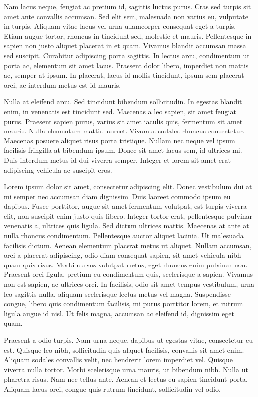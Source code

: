 Nam lacus neque, feugiat ac pretium id, sagittis luctus purus. Cras sed turpis sit amet ante convallis accumsan. Sed elit sem, malesuada non varius eu, vulputate in turpis. Aliquam vitae lacus vel urna ullamcorper consequat eget a turpis. Etiam augue tortor, rhoncus in tincidunt sed, molestie et mauris. Pellentesque in sapien non justo aliquet placerat in et quam. Vivamus blandit accumsan massa sed suscipit. Curabitur adipiscing porta sagittis. In lectus arcu, condimentum ut porta ac, elementum sit amet lacus. Praesent dolor libero, imperdiet non mattis ac, semper at ipsum. In placerat, lacus id mollis tincidunt, ipsum sem placerat orci, ac interdum metus est id mauris.

Nulla at eleifend arcu. Sed tincidunt bibendum sollicitudin. In egestas blandit enim, in venenatis est tincidunt sed. Maecenas a leo sapien, sit amet feugiat purus. Praesent sapien purus, varius sit amet iaculis quis, fermentum sit amet mauris. Nulla elementum mattis laoreet. Vivamus sodales rhoncus consectetur. Maecenas posuere aliquet risus porta tristique. Nullam nec neque vel ipsum facilisis fringilla at bibendum ipsum. Donec sit amet lacus sem, id ultrices mi. Duis interdum metus id dui viverra semper. Integer et lorem sit amet erat adipiscing vehicula ac suscipit eros. 

Lorem ipsum dolor sit amet, consectetur adipiscing elit. Donec vestibulum dui at mi semper nec accumsan diam dignissim. Duis laoreet commodo ipsum eu dapibus. Fusce porttitor, augue sit amet fermentum volutpat, est turpis viverra elit, non suscipit enim justo quis libero. Integer tortor erat, pellentesque pulvinar venenatis a, ultrices quis ligula. Sed dictum ultrices mattis. Maecenas at ante at nulla rhoncus condimentum. Pellentesque auctor aliquet lacinia. Ut malesuada facilisis dictum. Aenean elementum placerat metus ut aliquet. Nullam accumsan, orci a placerat adipiscing, odio diam consequat sapien, sit amet vehicula nibh quam quis risus. Morbi cursus volutpat metus, eget rhoncus enim pulvinar non. Praesent orci ligula, pretium eu condimentum quis, scelerisque a sapien. Vivamus non est sapien, ac ultrices orci. In facilisis, odio sit amet tempus vestibulum, urna leo sagittis nulla, aliquam scelerisque lectus metus vel magna. Suspendisse congue, libero quis condimentum facilisis, mi purus porttitor lorem, et rutrum ligula augue id nisl. Ut felis magna, accumsan ac eleifend id, dignissim eget quam.

Praesent a odio turpis. Nam urna neque, dapibus ut egestas vitae, consectetur eu est. Quisque leo nibh, sollicitudin quis aliquet facilisis, convallis sit amet enim. Aliquam sodales convallis velit, nec hendrerit lorem imperdiet vel. Quisque viverra nulla tortor. Morbi scelerisque urna mauris, ut bibendum nibh. Nulla ut pharetra risus. Nam nec tellus ante. Aenean et lectus eu sapien tincidunt porta. Aliquam lacus orci, congue quis rutrum tincidunt, sollicitudin vel odio.

